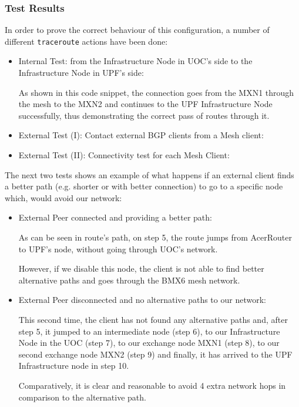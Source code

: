 \subsubsection{Test Results}
In order to prove the correct behaviour of this configuration, a number of different \texttt{traceroute} actions have been done:

\begin{itemize}
    \item Internal Test: from the Infrastructure Node in UOC's side to the Infrastructure Node in UPF's side:
    
    As shown in this code snippet, the connection goes from the MXN1 through the mesh to the MXN2 and continues to the UPF Infrastructure Node successfully, thus demonstrating the correct pass of routes through it.
    
    \item External Test (I): Contact external BGP clients from a Mesh client:
    
    \item External Test (II): Connectivity test for each Mesh Client:
    
\end{itemize}

The next two tests shows an example of what happens if an external client finds a better path (e.g. shorter or with better connection) to go to a specific node which, would avoid our network:

\begin{itemize}
    \item External Peer connected and providing a better path:
    
    As can be seen in route's path, on step 5, the route jumps from AcerRouter to UPF's node, without going through UOC's network.
    
    However, if we disable this node, the client is not able to find better alternative paths and goes through the BMX6 mesh network.
    \item External Peer disconnected and no alternative paths to our network:
    
    This second time, the client has not found any alternative paths and, after step 5, it jumped to an intermediate node (step 6), to our Infrastructure Node in the UOC (step 7), to our exchange node MXN1 (step 8), to our second exchange node MXN2 (step 9) and finally, it has arrived to the UPF Infrastructure node in step 10.
    
    Comparatively, it is clear and reasonable to avoid 4 extra network hops in comparison to the alternative path.
\end{itemize}
